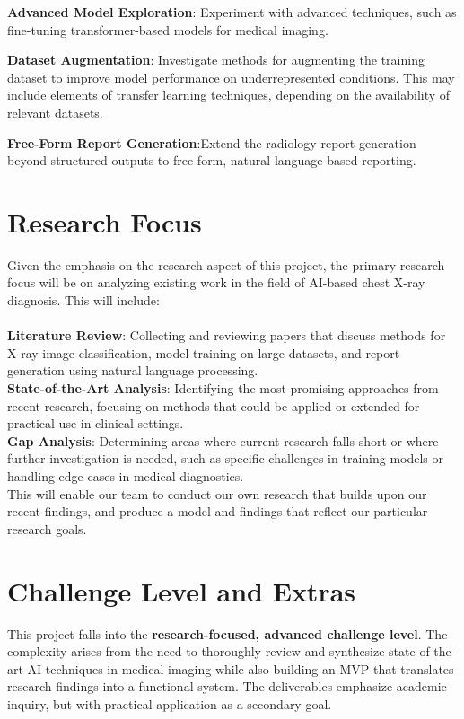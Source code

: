 \documentclass{article}
\begin{document}
\begin{itemize}
\begin{item}
    \textbf{Advanced Model Exploration}: Experiment with advanced techniques, such as fine-tuning transformer-based models for medical imaging.
\end{item}
\begin{item} 
    \textbf{Dataset Augmentation}: Investigate methods for augmenting the training dataset to improve model performance on underrepresented conditions. This may include elements of transfer learning techniques, depending on the availability of relevant datasets.
\end{item}
\begin{item} 
    \textbf{Free-Form Report Generation}:Extend the radiology report generation beyond structured outputs to free-form, natural language-based reporting.
\end{item}
\end{itemize}

\section{Research Focus}
Given the emphasis on the research aspect of this project, the primary research focus will be on analyzing existing work in the field of AI-based chest X-ray diagnosis. This will include:\\\\
\textbf{Literature Review}: Collecting and reviewing papers that discuss methods for X-ray image classification, model training on large datasets, and report generation using natural language processing.\\
\textbf{State-of-the-Art Analysis}: Identifying the most promising approaches from recent research, focusing on methods that could be applied or extended for practical use in clinical settings.\\
\textbf{Gap Analysis}: Determining areas where current research falls short or where further investigation is needed, such as specific challenges in training models or handling edge cases in medical diagnostics.\\

This will enable our team to conduct our own research that builds upon our recent findings, and produce a model and findings that reflect our particular research goals.


\section{Challenge Level and Extras}
This project falls into the \textbf{research-focused, advanced challenge level}. The complexity arises from the need to thoroughly review and synthesize state-of-the-art AI techniques in medical imaging while also building an MVP that translates research findings into a functional system. The deliverables emphasize academic inquiry, but with practical application as a secondary goal.\\
\end{document}
